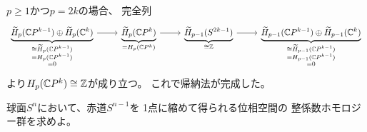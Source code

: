 \documentclass[report]{jlreq}
\begin{document}
\begin{answer}
    $p \ge 1$かつ$p = 2k$の場合、
    完全列
    \begin{equation}
        \begin{tikzcd}
            \underbrace{
                \widetilde{H}_p(\C P^{k - 1}) \oplus \widetilde{H}_p(\C^k)
            }_{\substack{
                \cong \widetilde{H}_p(\C P^{k - 1}) \\
                = H_p(\C P^{k - 1}) \\
                = 0
            }}
                \ar{r}
                & \underbrace{
                    \widetilde{H}_p(\C P^k)
                }_{= H_p(\C P^k)}
                    \ar{r}
                & \underbrace{
                    \widetilde{H}_{p-1}(S^{2k - 1})
                }_{\cong \Z}
                    \ar{r}
                & \underbrace{
                    \widetilde{H}_{p-1}(\C P^{k - 1}) \oplus \widetilde{H}_{p-1}(\C^k)
                }_{\substack{
                    \cong \widetilde{H}_{p-1}(\C P^{k - 1}) \\
                    = H_{p-1}(\C P^{k - 1}) \\
                    = 0
                }}
        \end{tikzcd}
    \end{equation}
    より$H_p(\mathbb{C} P^k) \cong \mathbb{Z}$が成り立つ。
    これで帰納法が完成した。
\end{answer}

\begin{problem}
    球面$S^n$において、赤道$S^{n - 1}$を
    1点に縮めて得られる位相空間の
    整係数ホモロジー群を求めよ。
\end{problem}
\end{document}
